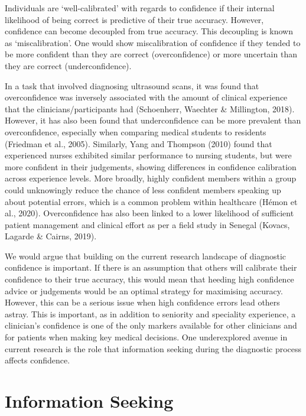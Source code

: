 \documentclass[a4paper, nobind]{templates/ociamthesis}
\begin{document}
Individuals are `well-calibrated' with regards to confidence if their internal likelihood of being correct is predictive of their true accuracy. However, confidence can become decoupled from true accuracy. This decoupling is known as `miscalibration'. One would show miscalibration of confidence if they tended to be more confident than they are correct (overconfidence) or more uncertain than they are correct (underconfidence).

In a task that involved diagnosing ultrasound scans, it was found that overconfidence was inversely associated with the amount of clinical experience that the clinicians/participants had (Schoenherr, Waechter \& Millington, 2018). However, it has also been found that underconfidence can be more prevalent than overconfidence, especially when comparing medical students to residents (Friedman et al., 2005). Similarly, Yang and Thompson (2010) found that experienced nurses exhibited similar performance to nursing students, but were more confident in their judgements, showing differences in confidence calibration across experience levels. More broadly, highly confident members within a group could unknowingly reduce the chance of less confident members speaking up about potential errors, which is a common problem within healthcare (Hémon et al., 2020). Overconfidence has also been linked to a lower likelihood of sufficient patient management and clinical effort as per a field study in Senegal (Kovacs, Lagarde \& Cairns, 2019).

We would argue that building on the current research landscape of diagnostic confidence is important. If there is an assumption that others will calibrate their confidence to their true accuracy, this would mean that heeding high confidence advice or judgements would be an optimal strategy for maximising accuracy. However, this can be a serious issue when high confidence errors lead others astray. This is important, as in addition to seniority and speciality experience, a clinician's confidence is one of the only markers available for other clinicians and for patients when making key medical decisions. One underexplored avenue in current research is the role that information seeking during the diagnostic process affects confidence.

\section*{Information Seeking}\label{information-seeking}
\end{document}
